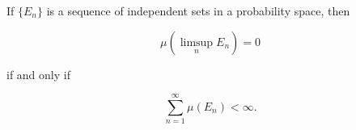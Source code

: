If $\{E_n\}$ is a sequence of independent sets in a probability space, then

$$\mu\left(\limsup_{n} E_n\right) = 0$$

if and only if

$$\sum_{n=1}^{\infty} \mu(E_n) < \infty.$$
